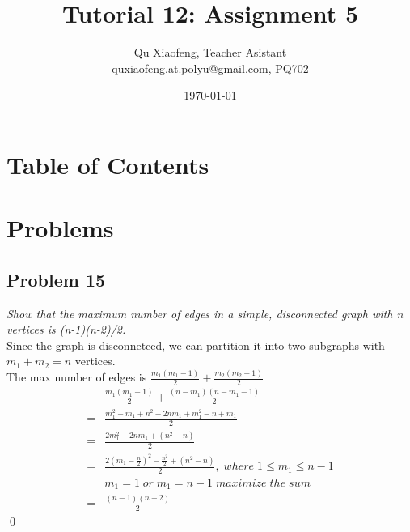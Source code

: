 \documentclass[
        handout,
        ]{beamer}
\title[Tutorial 12]{Tutorial 12: Assignment 5}
\author[COMP210]{Qu Xiaofeng\texorpdfstring{, Teacher Asistant\\\tiny{quxiaofeng.at.polyu@gmail.com, PQ702}}{}}
\institute{COMP210\\Discrete Structure}
\date{\today}
\begin{document}
\frame{\titlepage}

\section*{Table of Contents}

    \begin{frame}{\secname}
        \tableofcontents
    \end{frame}

   
\section{Problems}
    \subsection{Problem 15}
        \begin{frame}[c]{\subsecname}
            \emph{Show that the maximum number of edges in a simple, disconnected graph with n
vertices is (n-1)(n-2)/2.}\\\pause
            Since the graph is disconnetced, we can partition it into two subgraphs with $m_1+m_2=n$ vertices.\\
            The max number of edges is $\frac{m_1(m_1-1)}{2}+\frac{m_2(m_2-1)}{2}$
            \begin{align*}
             &\frac{m_1(m_1-1)}{2}+\frac{(n-m_1)(n-m_1-1)}{2}\\
            =&\frac{m_1^2-m_1+n^2-2nm_1+m_1^2-n+m_1}{2}\\
            =&\frac{2m_1^2-2nm_1+(n^2-n)}{2}\\
            =&\frac{2(m_1-\frac{n}{2})^2-\frac{n^2}{2}+(n^2-n)}{2},\; where\; 1\leq m_1 \leq n-1\\
             & m_1=1\; or \; m_1=n-1\; maximize\; the\; sum\\
            =&\frac{(n-1)(n-2)}{2}
            \end{align*}\qed
        \end{frame}
\end{document}
